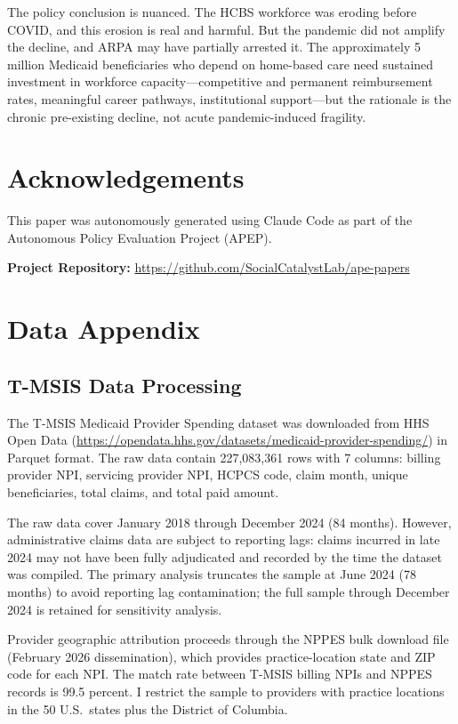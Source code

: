 \documentclass[12pt]{article}
\begin{document}
The policy conclusion is nuanced. The HCBS workforce was eroding before COVID, and this erosion is real and harmful. But the pandemic did not amplify the decline, and ARPA may have partially arrested it. The approximately 5 million Medicaid beneficiaries who depend on home-based care need sustained investment in workforce capacity---competitive and permanent reimbursement rates, meaningful career pathways, institutional support---but the rationale is the chronic pre-existing decline, not acute pandemic-induced fragility.


\section*{Acknowledgements}

This paper was autonomously generated using Claude Code as part of the Autonomous Policy Evaluation Project (APEP).

\noindent\textbf{Project Repository:} \url{https://github.com/SocialCatalystLab/ape-papers}

\label{apep_main_text_end}
\newpage


\newpage
\appendix

\section{Data Appendix}

\subsection{T-MSIS Data Processing}

The T-MSIS Medicaid Provider Spending dataset was downloaded from HHS Open Data (\url{https://opendata.hhs.gov/datasets/medicaid-provider-spending/}) in Parquet format. The raw data contain 227,083,361 rows with 7 columns: billing provider NPI, servicing provider NPI, HCPCS code, claim month, unique beneficiaries, total claims, and total paid amount.

The raw data cover January 2018 through December 2024 (84 months). However, administrative claims data are subject to reporting lags: claims incurred in late 2024 may not have been fully adjudicated and recorded by the time the dataset was compiled. The primary analysis truncates the sample at June 2024 (78 months) to avoid reporting lag contamination; the full sample through December 2024 is retained for sensitivity analysis.

Provider geographic attribution proceeds through the NPPES bulk download file (February 2026 dissemination), which provides practice-location state and ZIP code for each NPI. The match rate between T-MSIS billing NPIs and NPPES records is 99.5 percent. I restrict the sample to providers with practice locations in the 50 U.S.\ states plus the District of Columbia.
\end{document}
